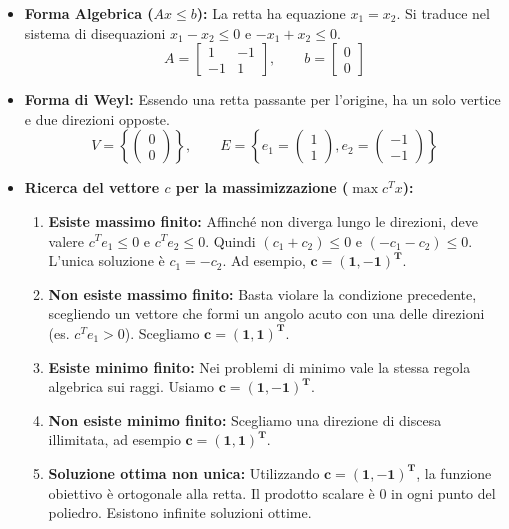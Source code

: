 \documentclass[12pt, a4paper]{article}
\begin{document}
	\begin{itemize}[label=\textcolor{titlecolor}{\Large\textbullet}, itemsep=4pt, leftmargin=1.5cm]
		\item \textbf{Forma Algebrica ($Ax \leq b$):} La retta ha equazione $x_1 = x_2$. Si traduce nel sistema di disequazioni $x_1 - x_2 \leq 0$ e $-x_1 + x_2 \leq 0$.
		\[
		A = \begin{bmatrix} 1 & -1 \\ -1 & 1 \end{bmatrix}, \qquad b = \begin{bmatrix} 0 \\ 0 \end{bmatrix}
		\]
		\item \textbf{Forma di Weyl:} Essendo una retta passante per l'origine, ha un solo vertice e due direzioni opposte.
		\[
		V = \left\{ \begin{pmatrix} 0 \\ 0 \end{pmatrix} \right\}, \qquad E = \left\{ e_1=\begin{pmatrix} 1 \\ 1 \end{pmatrix}, e_2=\begin{pmatrix} -1 \\ -1 \end{pmatrix} \right\}
		\]
		\item \textbf{Ricerca del vettore $c$ per la massimizzazione ($\max c^T x$):}
		\begin{enumerate}[label=\alph*)]
			\item \textbf{Esiste massimo finito:} Affinché non diverga lungo le direzioni, deve valere $c^T e_1 \leq 0$ e $c^T e_2 \leq 0$. Quindi $(c_1 + c_2) \leq 0$ e $(-c_1 - c_2) \leq 0$. L'unica soluzione è $c_1 = -c_2$. Ad esempio, $\mathbf{c = (1, -1)^T}$.
			\item \textbf{Non esiste massimo finito:} Basta violare la condizione precedente, scegliendo un vettore che formi un angolo acuto con una delle direzioni (es. $c^T e_1 > 0$). Scegliamo $\mathbf{c = (1, 1)^T}$.
			\item \textbf{Esiste minimo finito:} Nei problemi di minimo vale la stessa regola algebrica sui raggi. Usiamo $\mathbf{c = (1, -1)^T}$.
			\item \textbf{Non esiste minimo finito:} Scegliamo una direzione di discesa illimitata, ad esempio $\mathbf{c = (1, 1)^T}$.
			\item \textbf{Soluzione ottima non unica:} Utilizzando $\mathbf{c = (1, -1)^T}$, la funzione obiettivo è ortogonale alla retta. Il prodotto scalare è $0$ in ogni punto del poliedro. Esistono infinite soluzioni ottime.
		\end{enumerate}
	\end{itemize}
	
\end{document}

